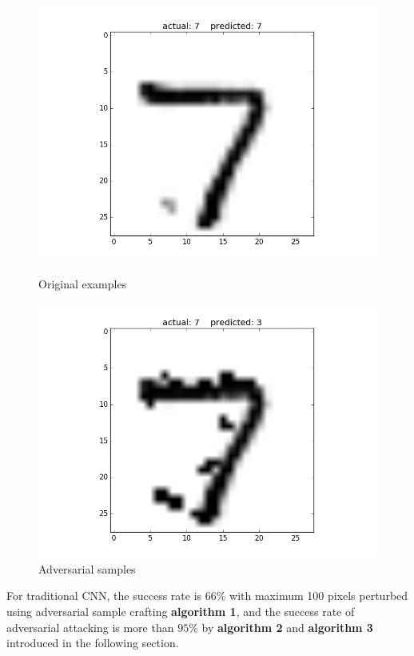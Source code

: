 \documentclass{article}
\begin{document}
\newpage
\begin{figure}[h!]
	\begin{minipage}{0.5\textwidth}
		\centering
		\includegraphics[width=\textwidth]{sample_original2.png}
		\caption{Original examples}
	\end{minipage} \hfill
	\begin{minipage}{0.5\textwidth}
		\centering
		\includegraphics[width=\textwidth]{sample_perturbed2.png}
		\caption{Adversarial samples}
	\end{minipage}
\end{figure}

For traditional CNN, the success rate is $66\%$ with maximum 100 pixels perturbed using adversarial sample crafting \textbf{algorithm 1}, and the success rate of adversarial attacking is more than $95\%$ by \textbf{algorithm 2} and \textbf{algorithm 3} introduced in the following section.
\end{document}
